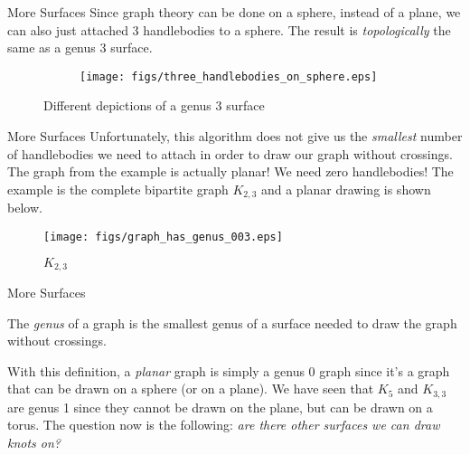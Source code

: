 \documentclass{beamer}
\begin{document}
    \begin{frame}{More Surfaces}
        Since graph theory can be done on a sphere, instead of a plane,
        we can also just attached 3 handlebodies to a sphere. The result is
        \textit{topologically} the same as a genus 3 surface.
        \begin{figure}
            \centering
            \begin{subfigure}[c]{0.49\textwidth}
                \texttt{[image: figs/three\_handlebodies\_on\_sphere.eps]}
                \label{fig:sphere_three_handlebodies}
            \end{subfigure}
            \begin{subfigure}[c]{0.49\textwidth}
                \label{fig:genus_3_surface}
            \end{subfigure}
            \caption{Different depictions of a genus 3 surface}
        \end{figure}
    \end{frame}
    \begin{frame}{More Surfaces}
        Unfortunately, this algorithm does not give us the
        \textit{smallest} number of handlebodies we need to attach in
        order to draw our graph without crossings. The graph from the
        example is actually planar! We need zero handlebodies!
        The example is the complete bipartite graph $K_{2,3}$ and a planar
        drawing is shown below.
        \begin{figure}
            \centering
            \texttt{[image: figs/graph\_has\_genus\_003.eps]}
            \caption{$K_{2,3}$}
            \label{fig:K_2_3}
        \end{figure}
    \end{frame}
    \begin{frame}{More Surfaces}
        \begin{definition}
            The \textit{genus} of a graph is the smallest genus of a
            surface needed to draw the graph without crossings.
        \end{definition}
        With this definition, a \textit{planar} graph is simply a genus 0 graph
        since it's a graph that can be drawn on a sphere (or on a plane). We have seen
        that $K_{5}$ and $K_{3,3}$ are genus 1 since they cannot be drawn on the plane,
        but can be drawn on a torus. The question now is the following:
        \textit{are there other surfaces we can draw knots on?}
    \end{frame}
\end{document}
